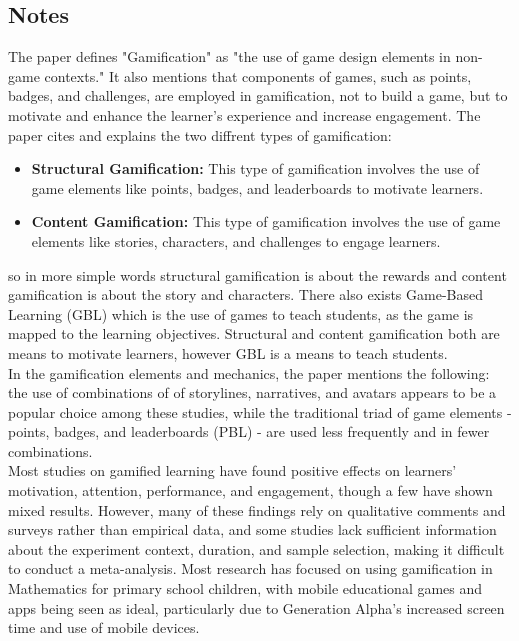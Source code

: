 \subsection{Notes} 
The paper defines "Gamification" as "the use of game design elements in non-game contexts." 
It also mentions that components of games, such as points, badges, and challenges, 
are employed in gamification, not to build a game, 
but to motivate and enhance the learner's experience and increase engagement.
The paper cites and explains the two diffrent types of gamification:
\begin{itemize}
    \item \textbf{Structural Gamification:} This type of gamification involves the use of game elements like points, badges, and leaderboards to motivate learners.
    \item \textbf{Content Gamification:} This type of gamification involves the use of game elements like stories, characters, and challenges to engage learners.
\end{itemize}
so in more simple words structural gamification is about the rewards and content gamification is about the story and characters.
There also exists Game-Based Learning (GBL) which is the use of games to teach students, 
as the game is mapped to the learning objectives.
Structural and content gamification both are means to motivate learners, however GBL is a means to teach students.
\\
In the gamification elements and mechanics, the paper mentions the following:
    the use of combinations of of storylines, narratives, and avatars appears to be a popular choice among these studies, while the traditional
    triad of game elements - points, badges, and leaderboards (PBL) - are used less frequently and in fewer
    combinations.
\\
Most studies on gamified learning have found positive effects on learners' motivation, attention, performance, and engagement, though a few have shown mixed results. However, many of these findings rely on qualitative comments and surveys rather than empirical data, and some studies lack sufficient information about the experiment context, duration, and sample selection, making it difficult to conduct a meta-analysis. Most research has focused on using gamification in Mathematics for primary school children, with mobile educational games and apps being seen as ideal, particularly due to Generation Alpha's increased screen time and use of mobile devices.
